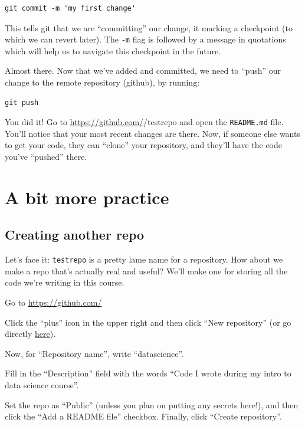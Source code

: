 \documentclass[
]{book}
\begin{document}
\begin{verbatim}
git commit -m 'my first change'
\end{verbatim}

This tells git that we are ``committing'' our change, it marking a checkpoint (to which we can revert later). The \texttt{-m} flag is followed by a message in quotations which will help us to navigate this checkpoint in the future.

Almost there. Now that we've added and committed, we need to ``push'' our change to the remote repository (github), by running:

\begin{verbatim}
git push
\end{verbatim}

You did it! Go to \url{https://github.com/}/testrepo and open the \texttt{README.md} file. You'll notice that your most recent changes are there. Now, if someone else wants to get your code, they can ``clone'' your repository, and they'll have the code you've ``pushed'' there.

\hypertarget{a-bit-more-practice}{%
\section*{A bit more practice}\label{a-bit-more-practice}}

\hypertarget{creating-another-repo}{%
\subsection*{Creating another repo}\label{creating-another-repo}}

Let's face it: \texttt{testrepo} is a pretty lame name for a repository. How about we make a repo that's actually real and useful? We'll make one for storing all the code we're writing in this course.

Go to \url{https://github.com/}

Click the ``plus'' icon in the upper right and then click ``New repository'' (or go directly \href{https://github.com/new}{here}).

Now, for ``Repository name'', write ``datascience''.

Fill in the ``Description'' field with the words ``Code I wrote during my intro to data science course''.

Set the repo as ``Public'' (unless you plan on putting any secrets here!), and then click the ``Add a README file'' checkbox. Finally, click ``Create repository''.
\end{document}

